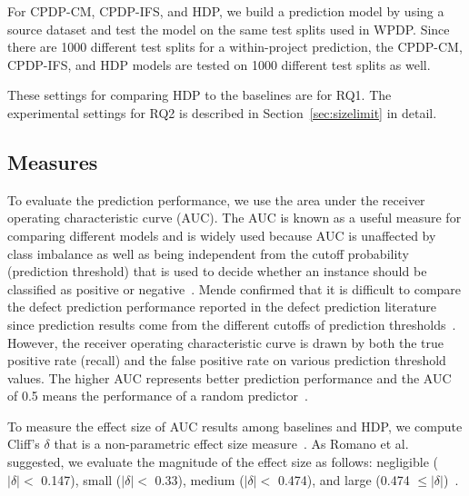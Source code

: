For CPDP-CM, CPDP-IFS, and HDP, we build a 
prediction model by using a source dataset and test the model on the same test
splits used in WPDP. Since there are 1000 different test
splits for a within-project prediction, the CPDP-CM, CPDP-IFS, and HDP models
are tested on 1000 different test splits as well.

These settings for comparing HDP to the baselines are for RQ1. The experimental settings for RQ2 is described in Section~\ref{sec:sizelimit} in detail.

\subsection{Measures}
\label{sec:measure}
To evaluate the prediction performance, we use the area under the receiver
operating characteristic curve (AUC). The AUC is known as a useful measure for comparing
different models and is widely used because AUC is unaffected by class imbalance
as well as being independent from the cutoff probability (prediction
threshold) that is used to decide whether an instance should be classified as
positive or negative~\cite{Giger12,Lessmann08,Rahman12,Song11}.
Mende confirmed that it is difficult to compare the defect prediction
performance reported in the defect prediction literature since prediction
results come from the different cutoffs of prediction thresholds~\cite{Mende10}.
However, the receiver operating characteristic curve is drawn by both the true
positive rate (recall) and the false positive rate on  various prediction
threshold values.
The higher AUC represents better prediction performance and the AUC of 0.5 means
the performance of a random predictor~\cite{Rahman12}.

To measure the effect size of AUC results among baselines and HDP, we compute Cliff's $\delta$ that is a non-parametric effect size measure~\cite{romano06}. As Romano et al. suggested, we evaluate the magnitude of the effect size as follows: negligible ($|\delta|<$ 0.147), small ($|\delta|<$ 0.33), medium ($|\delta|<$ 0.474), and large (0.474 $\leq|\delta|$)~\cite{romano06}.


